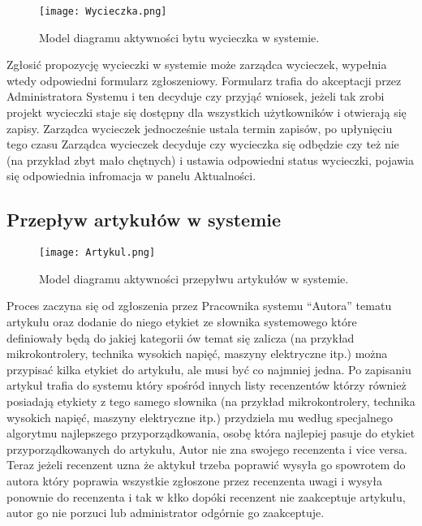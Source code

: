 \begin{figure}[!tb]
    \centering
    \texttt{[image: Wycieczka.png]}
    \caption{Model diagramu aktywności bytu wycieczka w systemie.}
    \label{fig:wycieczka}
\end{figure}

Zgłosić propozycję wycieczki w systemie może zarządca wycieczek, wypełnia wtedy odpowiedni formularz zgłoszeniowy. Formularz trafia do akceptacji przez Administratora Systemu i ten decyduje czy przyjąć wniosek, jeżeli tak zrobi projekt wycieczki staje się dostępny dla wszystkich użytkowników i otwierają się zapisy. Zarządca wycieczek jednocześnie ustala termin zapisów, po upłynięciu tego czasu Zarządca wycieczek decyduje czy wycieczka się odbędzie czy też nie (na przykład zbyt mało chętnych) i ustawia odpowiedni status wycieczki, pojawia się odpowiednia infromacja w panelu Aktualności.

\subsection{Przepływ artykułów w systemie}

\begin{figure}[!tb]
    \centering
    \texttt{[image: Artykul.png]}
    \caption{Model diagramu aktywności przepyłwu artykułów w systemie.}
    \label{fig:rodzina}
\end{figure}


Proces zaczyna się od zgłoszenia przez Pracownika systemu ``Autora'' tematu artykułu oraz dodanie do niego etykiet ze słownika systemowego które definiowały będą do jakiej kategorii ów temat się zalicza (na przykład mikrokontrolery, technika wysokich napięć, maszyny elektryczne itp.) można przypisać kilka etykiet do artykułu, ale musi być co najmniej jedna. Po zapisaniu artykuł trafia do systemu który spośród innych listy recenzentów którzy również posiadają etykiety z tego samego słownika  (na przykład mikrokontrolery, technika wysokich napięć, maszyny elektryczne itp.)  przydziela mu według specjalnego algorytmu najlepszego przyporządkowania, osobę która najlepiej pasuje do etykiet przyporządkowanych do artykułu, Autor nie zna swojego recenzenta i vice versa. Teraz jeżeli recenzent uzna że aktykuł trzeba poprawić wysyła go spowrotem do autora który poprawia wszystkie zgłoszone przez recenzenta uwagi i wysyła ponownie do recenzenta i tak w kłko dopóki recenzent nie zaakceptuje artykułu, autor go nie porzuci lub administrator odgórnie go zaakceptuje.

